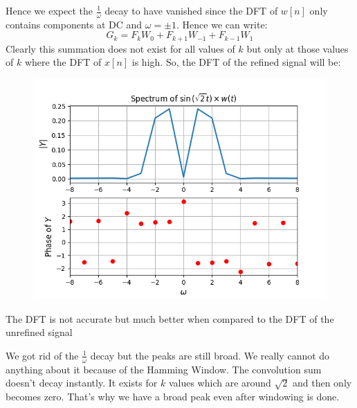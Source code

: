 \documentclass[12pt, a4paper]{article}
\begin{document}
Hence we expect the $\frac{1}{\omega}$ decay to have vanished since the DFT of $w[n]$ only contains components at DC and $\omega = \pm 1$. Hence we can write:
\begin{equation*}
    G_{k} = F_{k}W_{0} + F_{k+1}W_{-1} + F_{k-1}W_{1}
\end{equation*}
Clearly this summation does not exist for all values of $k$ but only at those values of $k$ where the DFT of $x[n]$ is high. So, the DFT of the refined signal will be:
\begin{figure}[H]
    \centering
    \includegraphics[scale = 0.8]{Figure_6.png}
    \label{fig:sample}
\end{figure}
\vspace*{-0.5cm}
\begin{center}
    The DFT is not accurate but much better when compared to the DFT of the unrefined signal
\end{center}
\vspace*{-0.5cm}
We got rid of the $\frac{1}{\omega}$ decay but the peaks are still broad. We really cannot do anything about it because of the Hamming Window. The convolution sum doesn't decay instantly. It exists for $k$ values which are around $\sqrt{2}$ and then only becomes zero. That's why we have a broad peak even after windowing is done.
\end{document}
